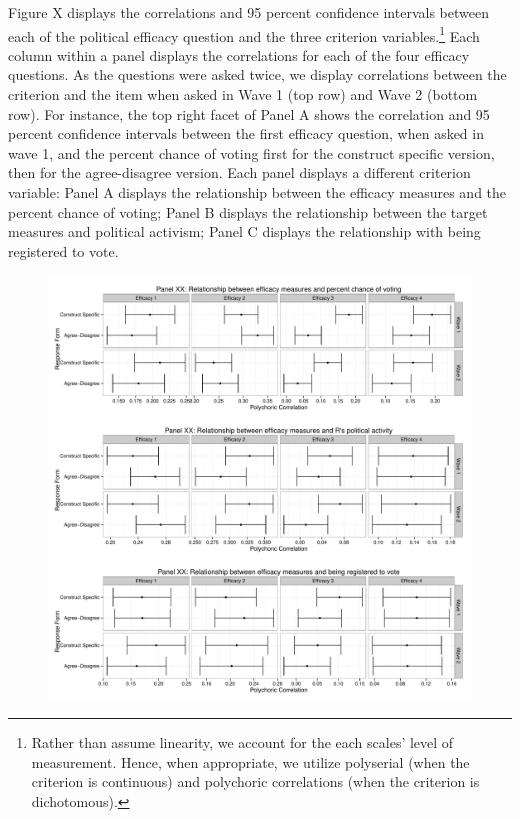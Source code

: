 \documentclass[man,apacite,floatsintext]{apa6}
\begin{document}
Figure X displays the correlations and 95 percent confidence intervals between each of the political efficacy question and the three criterion variables.\footnote{Rather than assume linearity, we account for the each scales' level of measurement. Hence, when appropriate, we utilize polyserial (when the criterion is continuous) and polychoric correlations (when the criterion is dichotomous).} Each column within a panel displays the correlations for each of the four efficacy questions. As the questions were asked twice, we display correlations between the criterion and the item when asked in Wave 1 (top row) and Wave 2 (bottom row). For instance, the top right facet of Panel A shows the correlation and 95 percent confidence intervals between the first efficacy question, when asked in wave 1, and the percent chance of voting first for the construct specific version, then for the agree-disagree version. Each panel displays a different criterion variable: Panel A displays the relationship between the efficacy measures and the percent chance of voting; Panel B displays the relationship between the target measures and political activism; Panel C displays the relationship with being registered to vote.

\begin{figure}
\includegraphics[width=\textwidth]{output/plot1validity.pdf}
\end{figure}
\end{document}
